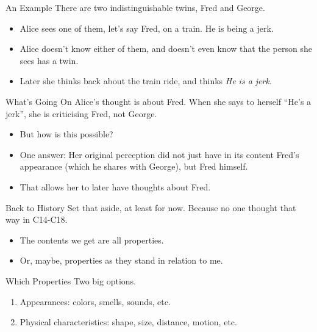 \documentclass[
  17pt,
  letterpaper,
  ignorenonframetext,
  aspectratio=169,
  handout]{beamer}
\providecommand{\tightlist}{%
  \setlength{\itemsep}{0pt}\setlength{\parskip}{0pt}}\usepackage{longtable,booktabs,array}
\begin{document}
\begin{frame}{An Example}
\protect\hypertarget{an-example}{}
There are two indistinguishable twins, Fred and George.

\begin{itemize}[<+->]
\tightlist
\item
  Alice sees one of them, let's say Fred, on a train. He is being a
  jerk.
\item
  Alice doesn't know either of them, and doesn't even know that the
  person she sees has a twin.
\item
  Later she thinks back about the train ride, and thinks \emph{He is a
  jerk}.
\end{itemize}
\end{frame}

\begin{frame}{What's Going On}
\protect\hypertarget{whats-going-on}{}
Alice's thought is about Fred. When she says to herself ``He's a jerk'',
she is criticising Fred, not George.

\begin{itemize}[<+->]
\tightlist
\item
  But how is this possible?
\item
  One answer: Her original perception did not just have in its content
  Fred's appearance (which he shares with George), but Fred himself.
\item
  That allows her to later have thoughts about Fred.
\end{itemize}
\end{frame}

\begin{frame}{Back to History}
\protect\hypertarget{back-to-history}{}
Set that aside, at least for now. Because no one thought that way in
C14-C18.

\begin{itemize}[<+->]
\tightlist
\item
  The contents we get are all properties.
\item
  Or, maybe, properties as they stand in relation to me.
\end{itemize}
\end{frame}

\begin{frame}{Which Properties}
\protect\hypertarget{which-properties}{}
Two big options.

\begin{enumerate}[<+->]
\tightlist
\item
  Appearances: colors, smells, sounds, etc.
\item
  Physical characteristics: shape, size, distance, motion, etc.
\end{enumerate}
\end{frame}
\end{document}

